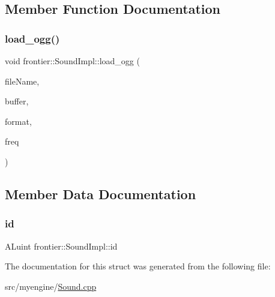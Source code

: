\subsection{Member Function Documentation}
\mbox{\label{structfrontier_1_1_sound_impl_ae4f90e7fb56a7ad9b4d506071e90fa58}} 
\subsubsection{\texorpdfstring{load\+\_\+ogg()}{load\_ogg()}}
{\footnotesize\ttfamily void frontier\+::\+Sound\+Impl\+::load\+\_\+ogg (\begin{DoxyParamCaption}\item[{std\+::string}]{file\+Name,  }\item[{std\+::vector$<$ char $>$ \&}]{buffer,  }\item[{A\+Lenum \&}]{format,  }\item[{A\+Lsizei \&}]{freq }\end{DoxyParamCaption})\hspace{0.3cm}{\ttfamily [inline]}}



\subsection{Member Data Documentation}
\mbox{\label{structfrontier_1_1_sound_impl_ae8b2e75a8ca0784b44f0e167d69a1128}} 
\subsubsection{\texorpdfstring{id}{id}}
{\footnotesize\ttfamily A\+Luint frontier\+::\+Sound\+Impl\+::id}



The documentation for this struct was generated from the following file\+:\begin{DoxyCompactItemize}
\item 
src/myengine/\hyperlink{_sound_8cpp}{Sound.\+cpp}\end{DoxyCompactItemize}
